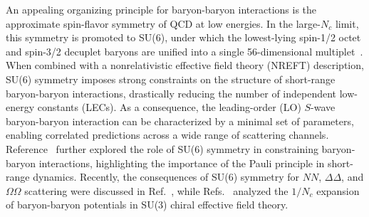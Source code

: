 \documentclass[prl,showpacs,twocolumn,superscriptaddress,floatfix,10pt,footinbib]{revtex4-2}
\begin{document}
An appealing organizing principle for baryon-baryon interactions is the approximate spin-flavor symmetry of QCD at low energies. In the large-$N_c$ limit, this symmetry is promoted to SU(6), under which the lowest-lying spin-1/2 octet and spin-3/2 decuplet baryons are unified into a single 56-dimensional multiplet~\cite{Kaplan:1995yg}. When combined with a nonrelativistic effective field theory (NREFT) description, SU(6) symmetry imposes strong constraints on the structure of short-range baryon-baryon interactions, drastically reducing the number of independent low-energy constants (LECs). As a consequence, the leading-order (LO) $S$-wave baryon-baryon interaction can be characterized by a minimal set of parameters, enabling correlated predictions across a wide range of scattering channels. Reference~\cite{Oka:2023hdc} further explored the role of SU(6) symmetry in constraining baryon-baryon interactions, highlighting the importance of the Pauli principle in short-range dynamics. Recently, the consequences of SU(6) symmetry for $NN$, $\Delta\Delta$, and $\Omega\Omega$ scattering were discussed in Ref.~\cite{Richardson:2024zln}, while Refs.~\cite{Vonk:2024lce, Bubpatate:2025eux} analyzed the $1/N_c$ expansion of baryon-baryon potentials in SU(3) chiral effective field theory.
\end{document}
